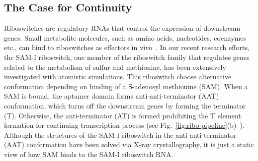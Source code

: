 \documentclass[a4paper,10pt]{article}
\newcommand{\yyenote}[1]{ {\textcolor{green} { ***YYE: #1 }}}
\newcommand{\yyenote}[1]{ {}}
\begin{document}


\subsection{The Case for Continuity}

Riboswitches are regulatory RNAs that control the expression of downstream genes. Small metabolite molecules, such as amino acids, nucleotides, coenzymes etc., can bind to riboswitches as effectors in vivo~\cite{mandal}.  In our recent research efforts, the SAM-I riboswitch, one member of the riboswitch family that regulates genes related to the metabolism of sulfur and methionine, has been extensively investigated with atomistic simulations.  This riboswitch choose alternative conformation depending on binding of a S-adenosyl methionine (SAM).  When a SAM is bound, the aptamer domain forms anti-anti-terminator (AAT) conformation, which turns off the downstream genes by forming the terminator (T). Otherwise, the anti-terminator (AT) is formed prohibiting the T element formation for continuing transcription process (see Fig.~\ref{fig:ribo-pipeline}(b)~\cite{brooke}).  Although the structures of the SAM-I riboswitch in the anti-anti-terminator (AAT) conformation have been solved via X-ray crystallography, it is just a static view of how SAM binds to the SAM-I riboswitch RNA.
\end{document}
